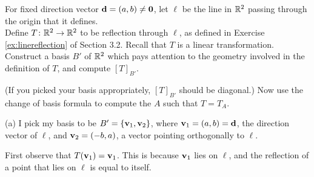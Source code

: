 \ii For fixed direction vector ${\mathbf d}=(a,b)\ne {\mathbf 0}$, let $\ell$ be the line in ${\mathbb R}^2$ passing through the origin that it defines. 
\\
Define $T\colon {\mathbb R}^2\rightarrow{\mathbb R}^2$ to be reflection through $\ell$, as defined in Exercise \ref{ex:linereflection} of Section 3.2. Recall that $T$ is a linear transformation. 
\bb
\ii Construct a basis $B'$ of ${\mathbb R}^2$ which pays attention to the geometry involved in the definition of $T$, and compute $[T]_{B'}$. 

(If you picked your basis appropriately, $[T]_{B'}$ should be diagonal.) 
\ii Now use the change of basis formula to compute the $A$ such that $T=T_A$. 
\ee
\begin{solution}
\noindent
(a) I pick my basis to be $B'=\{{\mathbf v}_1, {\mathbf v}_2\}$, where ${\mathbf v}_1=(a,b)={\mathbf d}$, the direction vector of $\ell$, and ${\mathbf v}_2=(-b,a)$, a vector pointing orthogonally to $\ell$. 

First observe that $T({\mathbf v}_1)={\mathbf v}_1$. This is because ${\mathbf v}_1$ lies on $\ell$, and the reflection of a point that lies on $\ell$ is equal to itself. 


\end{solution}
